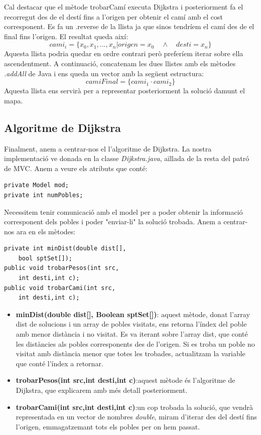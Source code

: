 \documentclass[conference]{IEEEtran}
\begin{document}
        Cal destacar que el mètode trobarCamí executa Dijkstra i posteriorment fa el recorregut des de el destí fins a l'origen per obtenir el camí amb el cost corresponent. Es fa un .reverse de la llista ja que sinos tendríem el camí des de el final fins l'origen. El resultat queda així:
        $$cami_{i}=\{x_{0},x_{1},...,x_{n}|origen=x_{0}\quad \land \quad desti=x_{n}\}$$
        Aquesta llista podria quedar en ordre contrari però preferíem iterar sobre ella ascendentment.
        A continuació, concatenam les dues llistes amb els mètodes \textit{.addAll} de Java i ens queda un vector amb la següent estructura:
        $$camiFinal=\{cami_{1}\cdot cami_{2}\}$$
        Aquesta llista ens servirà per a representar posteriorment la solució damunt el mapa.
        
    \subsection{Algoritme de Dijkstra}
        Finalment, anem a centrar-nos el l'algoritme de Dijkstra. La nostra implementació ve donada en la classe \textit{Dijkstra.java}, aïllada de la resta del patró de MVC. Anem a veure els atributs que conté:

        \begin{verbatim}
private Model mod;
private int numPobles;
        \end{verbatim}

        Necessitem tenir comunicació amb el model per a poder obtenir la informació corresponent dels pobles i poder "enviar-li" la solució trobada. Anem a centrar-nos ara en els mètodes:

        \begin{verbatim}
private int minDist(double dist[],
    bool sptSet[]);
public void trobarPesos(int src,
    int desti,int c);
public void trobarCami(int src,
    int desti,int c);
        \end{verbatim}

        \begin{itemize}
            \item \textbf{minDist(double dist[], Boolean sptSet[])}: aquest mètode, donat l'array dist de solucions i un array de pobles visitats, ens retorna l'índex del poble amb menor distància i no visitat. Es va iterant sobre l'array dist, que conté les distàncies als pobles corresponents des de l'origen. Si es troba un poble no visitat amb distància menor que totes les trobades, actualitzam la variable que conté l'índex a retornar. \\
            \item \textbf{trobarPesos(int src,int desti,int c)}:aquest mètode és l'algoritme de Dijkstra, que explicarem amb més detall posteriorment.\\
            \item \textbf{trobarCami(int src,int desti,int c)}:un cop trobada la solució, que vendrà representada en un vector de nombres \textit{double}, miram d'iterar des del destí fins l'origen, emmagatzemant tots els pobles per on hem passat.\\
        \end{itemize}
        
\end{document}
